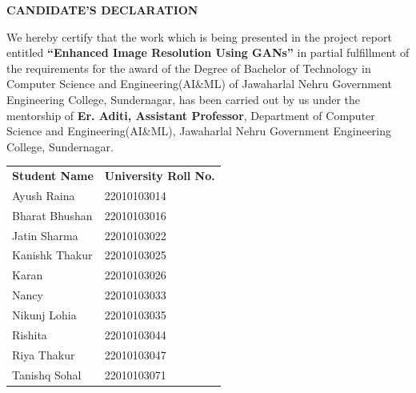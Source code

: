 \documentclass[a4paper,12pt]{report}
\begin{document}
\setcounter{page}{0}

\thispagestyle{empty}
\begin{center}
    {\Large \textbf{CANDIDATE’S DECLARATION}}\\[1.5cm]
\end{center}

\noindent
We hereby certify that the work which is being presented in the project report entitled \textbf{“Enhanced Image Resolution Using GANs”} in partial fulfillment of the requirements for the award of the Degree of Bachelor of Technology in Computer Science and Engineering(AI\&ML) of Jawaharlal Nehru Government Engineering College, Sundernagar, has been carried out by us under the mentorship of \textbf{Er. Aditi, Assistant Professor}, Department of Computer Science and Engineering(AI\&ML), Jawaharlal Nehru Government Engineering College, Sundernagar.



\vspace{0.5cm}
\begin{tabular}{ll}
\textbf{Student Name} & \textbf{University Roll No.}\\
Ayush Raina & 22010103014 \\
Bharat Bhushan & 22010103016 \\
Jatin Sharma & 22010103022 \\
Kanishk Thakur & 22010103025 \\
Karan & 22010103026 \\
Nancy & 22010103033 \\
Nikunj Lohia & 22010103035 \\
Rishita & 22010103044 \\
Riya Thakur & 22010103047 \\
Tanishq Sohal & 22010103071 \\
\end{tabular}

\vspace{2cm}

\newpage
\thispagestyle{empty}
\tableofcontents
\end{document}
